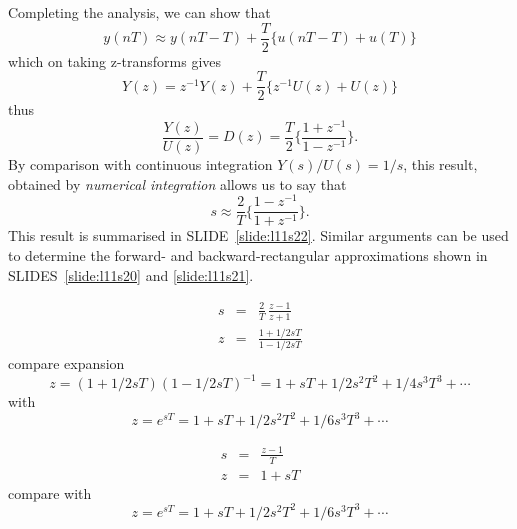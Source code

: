 \begin{slide}\label{slide:l11s20f}
\begin{center}
\end{center}
\end{slide}

Completing the analysis, we can show that $$y(nT)\approx y(nT-T) + \frac{T}{2}\{u(nT-T)+u(T)\}$$ which on taking z-transforms gives $$Y(z)=z^{-1}Y(z)+\frac{T}{2}\{z^{-1}U(z)+U(z)\}$$ thus 
\begin{equation}
\frac{Y(z)}{U(z)}=D(z)=\frac{T}{2}\{\frac{1+z^{-1}}{1-z^{-1}}\}.
\end{equation}
By comparison with continuous integration $Y(s)/U(s)=1/s$, this result, obtained by \emph{numerical integration} allows us to say that $$s \approx \frac{2}{T}\{\frac{1-z^{-1}}{1+z^{-1}}\}.$$ This result is summarised in SLIDE~\ref{slide:l11s22}. Similar arguments can be used to determine the forward- and backward-rectangular approximations shown in SLIDES~\ref{slide:l11s20} and \ref{slide:l11s21}.

\begin{slide}\label{slide:l11s22}
  
  \begin{eqnarray*}
     s &=& \frac{2}{T}\, \frac{z-1}{z+1} \\
     z &=& \frac{1 + 1/2 sT}{1 - 1/2 sT}
  \end{eqnarray*}
  compare expansion $$z=(1+ 1/2 sT)(1- 1/2 sT)^{-1} = 1 + sT + 1/2
 s^2T^2 + 1/4 s^3T^3
 + \cdots$$  with $$z = e^{sT} = 1 + sT + 1/2 s^2T^2 + 1/6 s^3T^3 + \cdots$$
\end{slide}

\begin{slide}\label{slide:l11s20}
  
  \begin{eqnarray*}
     s &=& \frac{z-1}{T} \\
     z &=& 1 + sT
  \end{eqnarray*}
  compare with $$z = e^{sT} = 1 + sT + 1/2 s^2T^2 + 1/6 s^3T^3 + \cdots$$
\end{slide}

